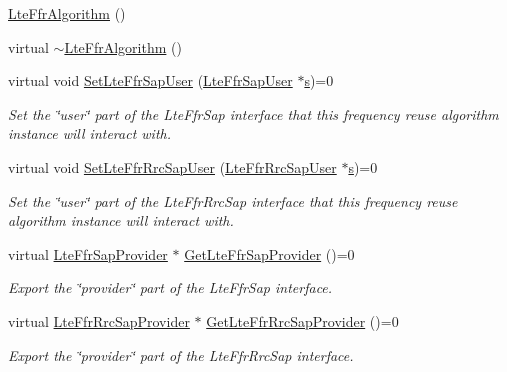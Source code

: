 \begin{DoxyCompactItemize}
\item 
\hyperlink{classns3_1_1LteFfrAlgorithm_a1cfb2b0c9339553d90bf3eee7b66b25f}{Lte\+Ffr\+Algorithm} ()
\item 
virtual \hyperlink{classns3_1_1LteFfrAlgorithm_aa9bb17a737f1cfc1fbf975a3b193de5f}{$\sim$\+Lte\+Ffr\+Algorithm} ()
\item 
virtual void \hyperlink{classns3_1_1LteFfrAlgorithm_a22cb3534944a24c224095eb5032b619e}{Set\+Lte\+Ffr\+Sap\+User} (\hyperlink{classns3_1_1LteFfrSapUser}{Lte\+Ffr\+Sap\+User} $\ast$\hyperlink{generate__test__data__lte__sinr_8m_ad83eeb3a142285d1243a08c6b7026df8}{s})=0
\begin{DoxyCompactList}\small\item\em Set the \char`\"{}user\char`\"{} part of the Lte\+Ffr\+Sap interface that this frequency reuse algorithm instance will interact with. \end{DoxyCompactList}\item 
virtual void \hyperlink{classns3_1_1LteFfrAlgorithm_a38d8d747064af1bf73c929942e75fe8f}{Set\+Lte\+Ffr\+Rrc\+Sap\+User} (\hyperlink{classns3_1_1LteFfrRrcSapUser}{Lte\+Ffr\+Rrc\+Sap\+User} $\ast$\hyperlink{generate__test__data__lte__sinr_8m_ad83eeb3a142285d1243a08c6b7026df8}{s})=0
\begin{DoxyCompactList}\small\item\em Set the \char`\"{}user\char`\"{} part of the Lte\+Ffr\+Rrc\+Sap interface that this frequency reuse algorithm instance will interact with. \end{DoxyCompactList}\item 
virtual \hyperlink{classns3_1_1LteFfrSapProvider}{Lte\+Ffr\+Sap\+Provider} $\ast$ \hyperlink{classns3_1_1LteFfrAlgorithm_aa6eef050df8fc5c1b047592ae36660f2}{Get\+Lte\+Ffr\+Sap\+Provider} ()=0
\begin{DoxyCompactList}\small\item\em Export the \char`\"{}provider\char`\"{} part of the Lte\+Ffr\+Sap interface. \end{DoxyCompactList}\item 
virtual \hyperlink{classns3_1_1LteFfrRrcSapProvider}{Lte\+Ffr\+Rrc\+Sap\+Provider} $\ast$ \hyperlink{classns3_1_1LteFfrAlgorithm_adaed0159c822cbe14d424361c5595c21}{Get\+Lte\+Ffr\+Rrc\+Sap\+Provider} ()=0
\begin{DoxyCompactList}\small\item\em Export the \char`\"{}provider\char`\"{} part of the Lte\+Ffr\+Rrc\+Sap interface. \end{DoxyCompactList}\item 

\end{DoxyCompactItemize}
